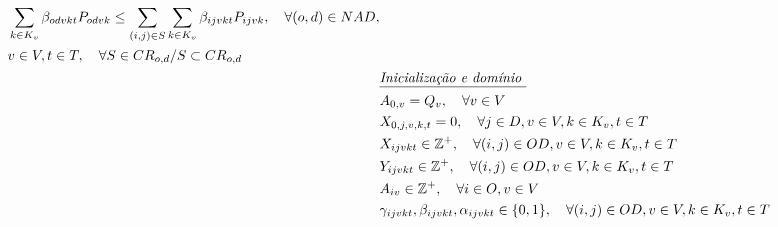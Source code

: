 \begin{align}
	 \begin{split}
	 	& \sum_{k \in K_v}\beta_{odvkt}P_{odvk} \leq \sum_{(i,j) \in S}\sum_{k \in K_v}\beta_{ijvkt}P_{ijvk}, \quad    \forall (o,d) \in NAD, \\
		& v \in V, t \in T , \quad  \forall S \in CR_{o,d} / S \subset CR_{o,d}           \\
	\end{split}                                                                                                                                                                                                       \label{eq: m1_preco_combinacao_rotas_contidas}                                          \\
	 & \textit{\underline{Inicialização e domínio }}    \notag                                                                                                                                                                                                                                      \\
	 & A_{0,v} = Q_v,     \quad  \forall v \in V                                                                                                                                                                                                 \label{eq: m1_ini_disponi}                                                    \\
	 & X_{0,j,v,k,t} = 0,     \quad \forall j \in D, v \in V, k \in K_v, t \in T                                                                                                                                      \label{eq: m1_ini_assig}                                                      \\
	 & X_{ijvkt} \in \mathbb{Z}^+ , \quad   \forall(i,j) \in OD, v \in V, k \in K_v, t \in T                                                                                                                                                                                     \label{eq: m1_dom_assig}                                                      \\
	 & Y_{ijvkt} \in \mathbb{Z}^+ , \quad   \forall(i,j) \in OD, v \in V, k \in K_v, t \in T                                                                                                                                                                                   \label{eq: m1_dom_autho}                                                      \\
	 & A_{iv} \in \mathbb{Z}^+  , \quad \forall i \in O, v \in V                                                                                                                                                                               \label{eq: m1_dom_disponi}                                                    \\
	 & \gamma_{ijvkt}, \beta_{ijvkt}, \alpha_{ijvkt}\in \{0,1\} , \quad   \forall(i,j) \in OD, v \in V, k \in K_v, t \in T                                                                                                                                                                                       \label{eq: m1_dom_bin_nadja}
\end{align}


